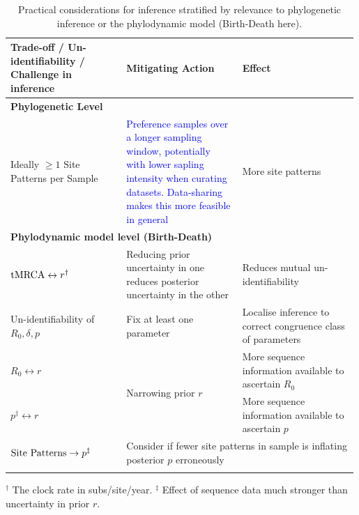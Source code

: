 \documentclass{article}
\begin{document}
\begin{table}[H]
\centering
\caption{Practical considerations for inference stratified by relevance to phylogenetic inference or the phylodynamic model (Birth-Death here).}
\begin{tabular}{p{0.33\linewidth} | p{0.33\linewidth} | p{0.33\linewidth}} 
\midrule
Trade-off / Un-identifiability / Challenge in inference & 
Mitigating Action &
Effect\\
\midrule
\multicolumn{3}{l}{\textbf{Phylogenetic Level}}\\

\midrule
Ideally $\geq1$ Site Patterns per Sample &
\textcolor{blue}{Preference samples over a longer sampling window, potentially with lower sapling intensity when curating datasets. Data-sharing makes this more feasible in general} &
More site patterns\\[0.25cm]

\midrule
\multicolumn{3}{l}{\textbf{Phylodynamic model level (Birth-Death)}}\\   

\midrule
$\textnormal{tMRCA} \leftrightarrow r^\dagger$  & 
Reducing prior uncertainty in one reduces posterior uncertainty in the other &
Reduces mutual un-identifiability \\[0.25cm]

Un-identifiability of $R_{0}, \delta, p$ &
Fix at least one parameter \citep{louca2021fundamental} &
Localise inference to correct congruence class of parameters\\[0.25cm]

$R_0 \leftrightarrow r$ &
\multirow{2}{*}{Narrowing prior $r$} &
More sequence information available to ascertain $R_0$\\[0.25cm]

$p^{\ddagger} \leftrightarrow r$ &
&
More sequence information available to ascertain $p$\\[0.25cm]

$\textnormal{Site Patterns} \rightarrow p^{\ddagger}$ &
\multicolumn{2}{l}{Consider if fewer site patterns in sample is inflating posterior $p$ erroneously}\\

\bottomrule 
\label{tab:pracRec}
\end{tabular}
\end{table}
\footnotesize{$^\dagger$ The clock rate in subs/site/year. $^{\ddagger}$ Effect of sequence data much stronger than uncertainty in prior $r$.}
\end{document}
